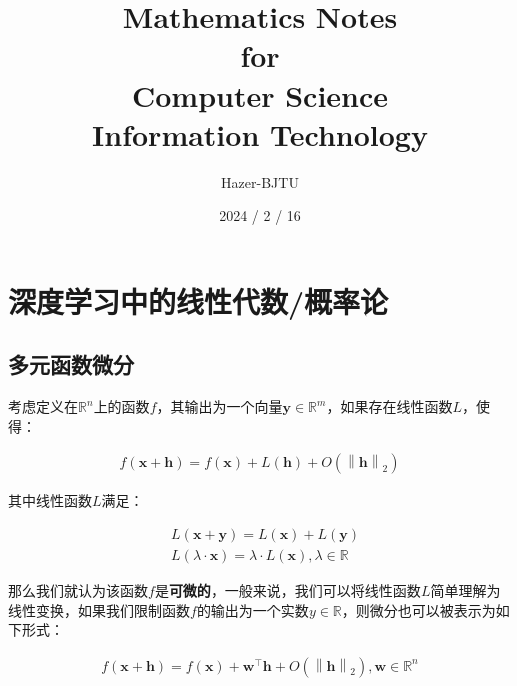 \documentclass[UTF8]{book}
\title{\Huge{Mathematics Notes} \\ \huge{for} \\ \Huge{Computer Science} \\ \Huge{Information Technology}}
\author{\Large Hazer-BJTU}
\date{\Large 2024 / 2 / 16}
\begin{document}
\maketitle
\tableofcontents %
\newpage


\section{深度学习中的线性代数/概率论}

\subsection{多元函数微分}
考虑定义在$\mathbb{R}^n$上的函数$f$，其输出为一个向量$\mathbf{y}\in \mathbb{R}^m$，如果存在线性函数$L$，使得：
\begin{large}
    \begin{equation}
        \begin{aligned}
            f(\mathbf{x}+\mathbf{h})=f(\mathbf{x})+L(\mathbf{h})+O\left (\left \| \mathbf{h} \right \|_2\right )
            \nonumber
        \end{aligned}
    \end{equation}
\end{large}
其中线性函数$L$满足：
\begin{large}
    \begin{equation}
        \begin{aligned}
            &L(\mathbf{x}+\mathbf{y})=L(\mathbf{x})+L(\mathbf{y}) \\
            &L(\lambda \cdot \mathbf x)=\lambda \cdot L(\mathbf x), \lambda \in \mathbb{R}
            \nonumber 
        \end{aligned}
    \end{equation}
\end{large}
那么我们就认为该函数$f$是\textbf{可微的}，一般来说，我们可以将线性函数$L$简单理解为线性变换，如果我们限制函数$f$的输出为一个实数$y\in\mathbb{R}$，则微分也可以被表示为如下形式：
\begin{large}
    \begin{equation}
        \begin{aligned}
            f(\mathbf{x}+\mathbf{h})=f(\mathbf{x})+\mathbf{w}^\top\mathbf{h}+O\left (\left \| \mathbf{h} \right \|_2\right ), \mathbf{w}\in \mathbb{R}^n
            \nonumber
        \end{aligned}
    \end{equation}
\end{large}
\end{document}
